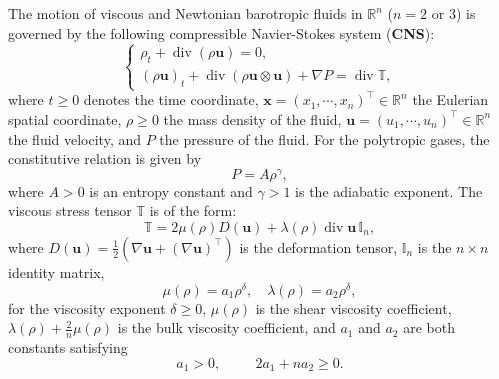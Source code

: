 \documentclass[11pt,reqno]{amsart}
\DeclareMathOperator{\diver}{\mathrm{div}}
\numberwithin{rk}{section}
\numberwithin{prop}{section}
\numberwithin{mydef}{section}
\numberwithin{lem}{section}
\numberwithin{equation}{section}
\numberwithin{thm}{section}
\begin{document}
The motion of viscous and Newtonian barotropic 
fluids in $\mathbb{R}^n$ ($n=2$ or $3$) is governed by the following compressible Navier-Stokes system (\textbf{CNS}):
\begin{equation}\label{eq:1.1}
\begin{cases}
\displaystyle 
\rho_t+\diver(\rho \boldsymbol{u})=0,\\[4pt]
\displaystyle
(\rho \boldsymbol{u})_t+\diver(\rho \boldsymbol{u}\otimes \boldsymbol{u})
+\nabla P =\diver \mathbb{T},
\end{cases}
\end{equation}
where $t\geq 0$ denotes  the time coordinate, $\boldsymbol{x}=(x_1,\cdots\!,x_n)^\top\in \mathbb{R}^n$  the Eulerian spatial coordinate, $\rho\geq 0$  the  mass density of the fluid,  $\boldsymbol{u}=(u_1,\cdots\!,u_n)^\top\in \mathbb{R}^n$   the fluid velocity, and  $P$ the pressure of the fluid.  For the polytropic gases, the constitutive relation is given by
\begin{equation*}
P=A\rho^{\gamma},
\end{equation*}
where $A>0$ is  an entropy  constant and  $\gamma>1$ is the adiabatic exponent.  The viscous stress tensor $\mathbb{T}$ is of the form: 
\begin{equation}\label{eq:1.1t}
\mathbb{T}=2\mu(\rho)D(\boldsymbol{u})+\lambda(\rho)\diver\boldsymbol{u}\,\mathbb{I}_n,
\end{equation} 
where $D(\boldsymbol{u})=\frac{1}{2}(\nabla \boldsymbol{u}+(\nabla \boldsymbol{u})^\top)$ is the deformation tensor, $\mathbb{I}_n$ is the $n\times n$ identity matrix,
\begin{equation}\label{fandan}
\mu(\rho)=a_1  \rho^\delta,\quad \lambda(\rho)=a_2\rho^\delta,
\end{equation}
for the viscosity exponent  $\delta\geq 0$, $\mu(\rho)$ is the shear viscosity coefficient, $\lambda(\rho)+\frac{2}{n}\mu(\rho)$ is the bulk viscosity coefficient,  and $a_1$ and $a_2$ are both constants satisfying
\begin{equation}\label{kelaoxiusi}
a_1>0 ,\qquad \ \  2a_1+n a_2\geq 0.
\end{equation}
\end{document}
